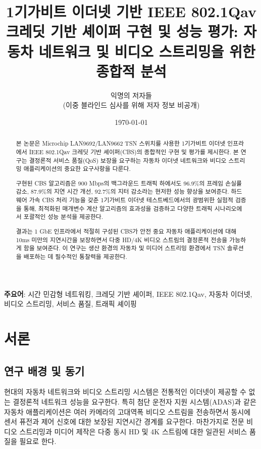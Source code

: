 \documentclass[12pt, a4paper]{article}
\begin{document}
\title{
\huge{1기가비트 이더넷 기반 IEEE 802.1Qav 크레딧 기반 셰이퍼 구현 및 성능 평가: 자동차 네트워크 및 비디오 스트리밍을 위한 종합적 분석}
}

\author{
\large{익명의 저자들}\\
\large{(이중 블라인드 심사를 위해 저자 정보 비공개)}
}

\date{\today}

\maketitle

\begin{abstract}
본 논문은 Microchip LAN9692/LAN9662 TSN 스위치를 사용한 1기가비트 이더넷 인프라에서 IEEE 802.1Qav 크레딧 기반 셰이퍼(CBS)의 종합적인 구현 및 평가를 제시한다. 본 연구는 결정론적 서비스 품질(QoS) 보장을 요구하는 자동차 이더넷 네트워크와 비디오 스트리밍 애플리케이션의 중요한 요구사항을 다룬다. 

구현된 CBS 알고리즘은 900 Mbps의 백그라운드 트래픽 하에서도 96.9\%의 프레임 손실률 감소, 87.9\%의 지연 시간 개선, 92.7\%의 지터 감소라는 현저한 성능 향상을 보여준다. 하드웨어 가속 CBS 처리 기능을 갖춘 1기가비트 이더넷 테스트베드에서의 광범위한 실험적 검증을 통해, 최적화된 매개변수 계산 알고리즘의 효과성을 검증하고 다양한 트래픽 시나리오에서 포괄적인 성능 분석을 제공한다.

결과는 1 GbE 인프라에서 적절히 구성된 CBS가 안전 중요 자동차 애플리케이션에 대해 10ms 미만의 지연시간을 보장하면서 다중 HD/4K 비디오 스트림의 결정론적 전송을 가능하게 함을 보여준다. 이 연구는 생산 환경의 자동차 및 미디어 스트리밍 환경에서 TSN 솔루션을 배포하는 데 필수적인 통찰력을 제공한다.
\end{abstract}

\textbf{주요어}: 시간 민감형 네트워킹, 크레딧 기반 셰이퍼, IEEE 802.1Qav, 자동차 이더넷, 비디오 스트리밍, 서비스 품질, 트래픽 셰이핑

\newpage

\tableofcontents

\newpage

\section{서론}

\subsection{연구 배경 및 동기}

현대의 자동차 네트워크와 비디오 스트리밍 시스템은 전통적인 이더넷이 제공할 수 없는 결정론적 네트워크 성능을 요구한다. 특히 첨단 운전자 지원 시스템(ADAS)과 같은 자동차 애플리케이션은 여러 카메라의 고대역폭 비디오 스트림을 전송하면서 동시에 센서 퓨전과 제어 신호에 대한 보장된 지연시간 경계를 요구한다. 마찬가지로 전문 비디오 스트리밍과 미디어 제작은 다중 동시 HD 및 4K 스트림에 대한 일관된 서비스 품질을 필요로 한다.
\end{document}
